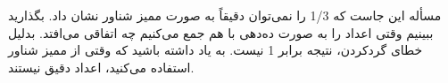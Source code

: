 \section{}
\paragraph{}\label{answer:54}
مسأله این جاست که 1/3 را نمی‌توان دقیقاً به صورت ممیز شناور نشان داد. بگذارید ببینیم وقتی اعداد را به صورت ده‌دهی با هم جمع می‌کنیم چه اتفاقی می‌افتد.
\LTR\noindent
{}
\RTL
بدلیل خطای گردکردن، نتیجه برابر 1 نیست. به یاد داشته باشید که وقتی از ممیز شناور استفاده می‌کنید، اعداد دقیق نیستند.